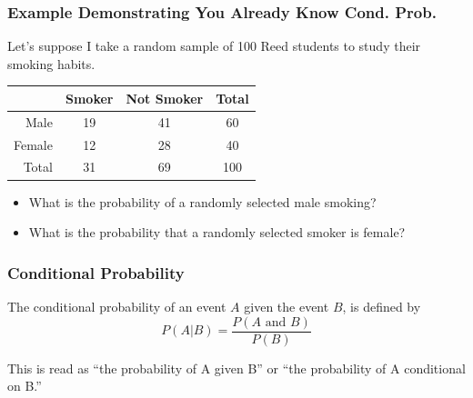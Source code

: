 \documentclass[slides]{beamer}
\newcommand{\blue}[1]{\textcolor{blue2}{#1}}
\begin{document}
\begin{frame}
\frametitle{Example Demonstrating You Already Know Cond. Prob.}

Let's suppose I take a random sample of 100 Reed students to study their smoking habits.
\begin{center}
  \begin{tabular}{r|cc|c}
	&Smoker&Not Smoker&Total\\
	\hline
Male&19&41&60\\
Female&12&28&40\\
\hline
Total&31&69&100\\
\end{tabular}
\end{center}

\begin{small}
\begin{itemize}
\pause \item What is the probability of a randomly selected male smoking?
\vspace{1cm}
\pause \item What is the probability that a randomly selected smoker is female?
\end{itemize}
\end{small}

\end{frame}


\begin{frame}
\frametitle{Conditional Probability}
The \blue{conditional probability} of an event $A$ given the event $B$, is defined by
\[
P(A|B) = \frac{P(A \mbox{ and } B)}{P(B)}
\]  

\vspace{0.5cm}

This is read as ``the probability of A \blue{given} B'' or ``the probability of A \blue{conditional on} B.''

\end{frame}
\end{document}
